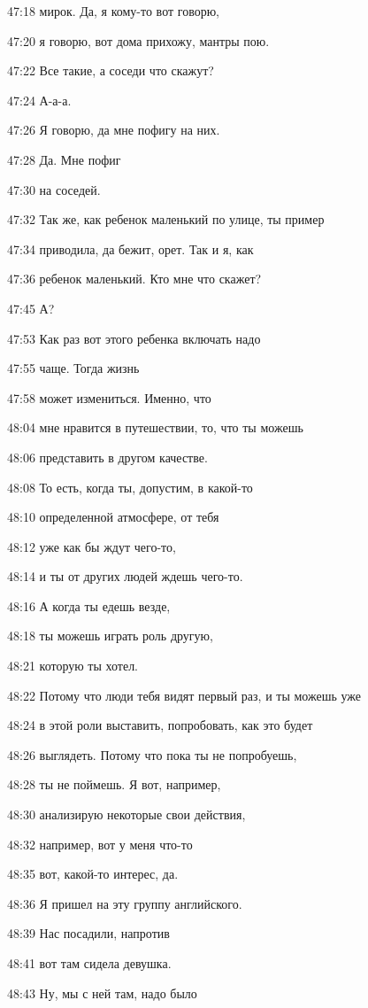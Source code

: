 47:18
мирок. Да, я кому-то вот говорю,

47:20
я говорю, вот дома прихожу, мантры пою.

47:22
Все такие, а соседи что скажут?

47:24
А-а-а.

47:26
Я говорю, да мне пофигу на них.

47:28
Да. Мне пофиг

47:30
на соседей.

47:32
Так же, как ребенок маленький по улице, ты пример

47:34
приводила, да бежит, орет. Так и я, как

47:36
ребенок маленький. Кто мне что скажет?

47:45
А?

47:53
Как раз вот этого ребенка включать надо

47:55
чаще. Тогда жизнь

47:58
может измениться. Именно, что

48:04
мне нравится в путешествии, то, что ты можешь

48:06
представить в другом качестве.

48:08
То есть, когда ты, допустим, в какой-то

48:10
определенной атмосфере, от тебя

48:12
уже как бы ждут чего-то,

48:14
и ты от других людей ждешь чего-то.

48:16
А когда ты едешь везде,

48:18
ты можешь играть роль другую,

48:21
которую ты хотел.

48:22
Потому что люди тебя видят первый раз, и ты можешь уже

48:24
в этой роли выставить, попробовать, как это будет

48:26
выглядеть. Потому что пока ты не попробуешь,

48:28
ты не поймешь. Я вот, например,

48:30
анализирую некоторые свои действия,

48:32
например, вот у меня что-то

48:35
вот, какой-то интерес, да.

48:36
Я пришел на эту группу английского.

48:39
Нас посадили, напротив

48:41
вот там сидела девушка.

48:43
Ну, мы с ней там, надо было

